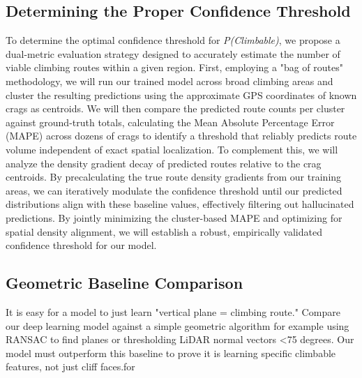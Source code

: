 \documentclass{mva2011}
\begin{document}
\subsection{Determining the Proper Confidence Threshold}
To determine the optimal confidence threshold for \emph{P(Climbable)}, we propose a dual-metric evaluation strategy designed to accurately estimate the number of viable climbing routes within a given region. First, employing a "bag of routes" methodology, we will run our trained model across broad climbing areas and cluster the resulting predictions using the approximate GPS coordinates of known crags as centroids. We will then compare the predicted route counts per cluster against ground-truth totals, calculating the Mean Absolute Percentage Error (MAPE) across dozens of crags to identify a threshold that reliably predicts route volume independent of exact spatial localization. To complement this, we will analyze the density gradient decay of predicted routes relative to the crag centroids. By precalculating the true route density gradients from our training areas, we can iteratively modulate the confidence threshold until our predicted distributions align with these baseline values, effectively filtering out hallucinated predictions. By jointly minimizing the cluster-based MAPE and optimizing for spatial density alignment, we will establish a robust, empirically validated confidence threshold for our model.

\subsection{Geometric Baseline Comparison}
It is easy for a model to just learn "vertical plane = climbing route." Compare our deep learning model against a simple geometric algorithm for example using RANSAC to find planes or thresholding LiDAR normal vectors \textless   75 degrees. Our model must outperform this baseline to prove it is learning specific climbable features, not just cliff faces.for
\end{document}
